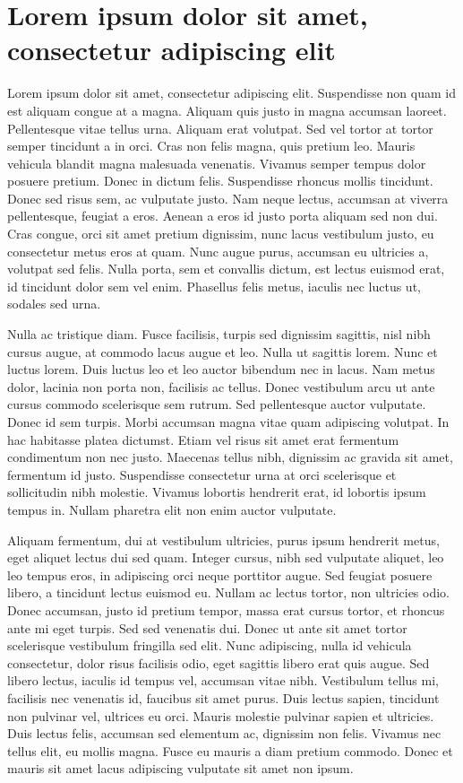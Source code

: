 \documentclass{EPUProjetDi}
\begin{document}
\section{Lorem ipsum dolor sit amet, consectetur adipiscing elit}

Lorem ipsum dolor sit amet, consectetur adipiscing elit. Suspendisse non quam id est aliquam congue at a magna. Aliquam quis justo in magna accumsan laoreet. Pellentesque vitae tellus urna. Aliquam erat volutpat. Sed vel tortor at tortor semper tincidunt a in orci. Cras non felis magna, quis pretium leo. Mauris vehicula blandit magna malesuada venenatis. Vivamus semper tempus dolor posuere pretium. Donec in dictum felis. Suspendisse rhoncus mollis tincidunt. Donec sed risus sem, ac vulputate justo. Nam neque lectus, accumsan at viverra pellentesque, feugiat a eros. Aenean a eros id justo porta aliquam sed non dui. Cras congue, orci sit amet pretium dignissim, nunc lacus vestibulum justo, eu consectetur metus eros at quam. Nunc augue purus, accumsan eu ultricies a, volutpat sed felis. Nulla porta, sem et convallis dictum, est lectus euismod erat, id tincidunt dolor sem vel enim. Phasellus felis metus, iaculis nec luctus ut, sodales sed urna.

Nulla ac tristique diam. Fusce facilisis, turpis sed dignissim sagittis, nisl nibh cursus augue, at commodo lacus augue et leo. Nulla ut sagittis lorem. Nunc et luctus lorem. Duis luctus leo et leo auctor bibendum nec in lacus. Nam metus dolor, lacinia non porta non, facilisis ac tellus. Donec vestibulum arcu ut ante cursus commodo scelerisque sem rutrum. Sed pellentesque auctor vulputate. Donec id sem turpis. Morbi accumsan magna vitae quam adipiscing volutpat. In hac habitasse platea dictumst. Etiam vel risus sit amet erat fermentum condimentum non nec justo. Maecenas tellus nibh, dignissim ac gravida sit amet, fermentum id justo. Suspendisse consectetur urna at orci scelerisque et sollicitudin nibh molestie. Vivamus lobortis hendrerit erat, id lobortis ipsum tempus in. Nullam pharetra elit non enim auctor vulputate.

Aliquam fermentum, dui at vestibulum ultricies, purus ipsum hendrerit metus, eget aliquet lectus dui sed quam. Integer cursus, nibh sed vulputate aliquet, leo leo tempus eros, in adipiscing orci neque porttitor augue. Sed feugiat posuere libero, a tincidunt lectus euismod eu. Nullam ac lectus tortor, non ultricies odio. Donec accumsan, justo id pretium tempor, massa erat cursus tortor, et rhoncus ante mi eget turpis. Sed sed venenatis dui. Donec ut ante sit amet tortor scelerisque vestibulum fringilla sed elit. Nunc adipiscing, nulla id vehicula consectetur, dolor risus facilisis odio, eget sagittis libero erat quis augue. Sed libero lectus, iaculis id tempus vel, accumsan vitae nibh. Vestibulum tellus mi, facilisis nec venenatis id, faucibus sit amet purus. Duis lectus sapien, tincidunt non pulvinar vel, ultrices eu orci. Mauris molestie pulvinar sapien et ultricies. Duis lectus felis, accumsan sed elementum ac, dignissim non felis. Vivamus nec tellus elit, eu mollis magna. Fusce eu mauris a diam pretium commodo. Donec et mauris sit amet lacus adipiscing vulputate sit amet non ipsum.
\end{document}
